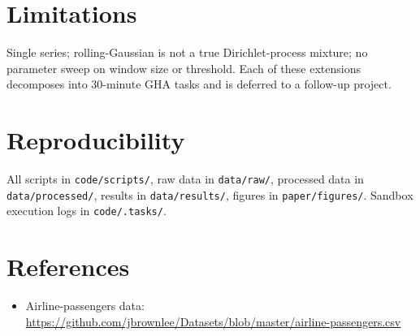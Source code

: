 \documentclass[11pt]{article}
\begin{document}
\section{Limitations}
Single series; rolling-Gaussian is not a true Dirichlet-process mixture; no parameter sweep on window size or threshold. Each of these extensions decomposes into 30-minute GHA tasks and is deferred to a follow-up project.

\section{Reproducibility}
All scripts in \texttt{code/scripts/}, raw data in \texttt{data/raw/}, processed data in \texttt{data/processed/}, results in \texttt{data/results/}, figures in \texttt{paper/figures/}. Sandbox execution logs in \texttt{code/.tasks/}.

\section*{References}
\begin{itemize}
  \item Airline-passengers data: \url{https://github.com/jbrownlee/Datasets/blob/master/airline-passengers.csv}
\end{itemize}
\end{document}
